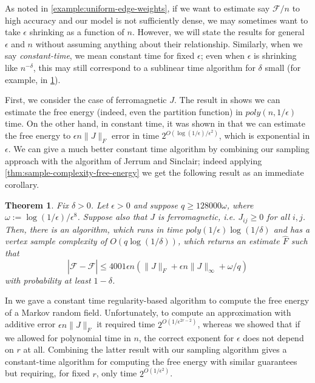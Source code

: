 \documentclass[final, 12pt]{colt2018}
\newcommand{\F}{\mathcal{F}}
\newtheorem{theorem}{Theorem}[section]
\theoremstyle{definition}
\theoremstyle{plain}
\begin{document}
As noted in \cref{example:uniform-edge-weights}, if we want to estimate say $\F/n$ to high accuracy and our model is not sufficiently dense, we may sometimes want to take $\epsilon$ shrinking as a function of $n$. However, we will state
the results for general $\epsilon$ and $n$ without assuming anything about their relationship. Similarly, when we say \emph{constant-time}, we mean constant time for fixed $\epsilon$; even when $\epsilon$ is shrinking like $n^{-\delta}$, this may still correspond to a sublinear time algorithm for $\delta$ small (for example, in \cref{thm:sampling-jerrum-sinclair}).

First, we consider the case of ferromagnetic $J$. The result in \citep{JerrumSinclair:90} shows we can estimate the free energy (indeed, even the partition function) in $poly(n,1/\epsilon)$ time. On the other
hand, in constant time, it was shown in \citep{previous-paper} that we can estimate the free energy to $\epsilon n \|J\|_F$ error in time $2^{O(\log(1/\epsilon)/\epsilon^2)}$, which is exponential in $\epsilon$. We can give a much better constant time algorithm by combining our sampling approach with the algorithm
of Jerrum and Sinclair; indeed applying \cref{thm:sample-complexity-free-energy} we get the following result as an immediate corollary.

\begin{theorem}\label{thm:sampling-jerrum-sinclair}
Fix $\delta > 0$.
Let $\epsilon > 0$ and suppose $q \ge 128000\omega$, where $\omega:=\log(1/\epsilon)/\epsilon^{8}$. 
Suppose also that $J$ is ferromagnetic, i.e. $J_{ij} \ge 0$ for all $i,j$.
Then, there is an algorithm, which runs in time $poly(1/\epsilon)\log(1/\delta)$ and has a vertex sample complexity of $O(q\log(1/\delta))$, which returns an estimate $\hat{F}$ such that
$$\left|\F - \hat{\F}\right| \leq 4001 \epsilon n \left(\|J\|_F + \epsilon n \|J\|_{\infty} + \omega/q \right)$$
with probability at least $1 - \delta$.
\end{theorem}

In \citep{previous-paper} we gave a constant time regularity-based algorithm to compute the free energy of a Markov random field. Unfortunately, to compute
an approximation with additive error $\epsilon n \|J\|_F$ it required time $2^{O(1/\epsilon^{2r - 2})}$, whereas we showed that if we allowed for polynomial
time in $n$, the correct exponent for $\epsilon$ does not depend on $r$ at all. Combining the latter result with our sampling algorithm gives a constant-time algorithm for computing the free energy with similar guarantees but requiring, for fixed $r$, only time $2^{O(1/\epsilon^2)}$.
\end{document}
